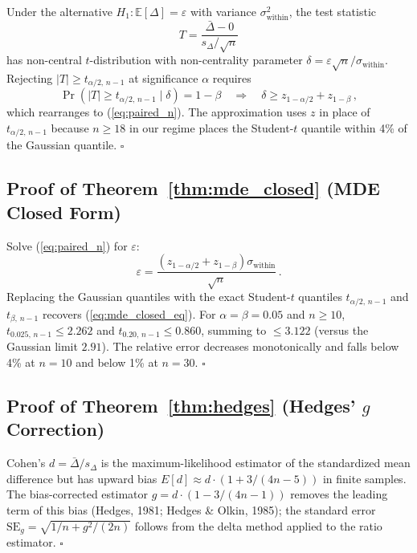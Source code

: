 \documentclass[11pt]{article}
\theoremstyle{definition}
\begin{document}
Under the alternative $H_1: \mathbb{E}[\Delta] = \varepsilon$ with variance $\sigma_\text{within}^2$, the test statistic
\begin{equation*}
    T = \frac{\bar{\Delta} - 0}{s_\Delta / \sqrt{n}}
\end{equation*}
has non-central $t$-distribution with non-centrality parameter $\delta = \varepsilon \sqrt{n} / \sigma_\text{within}$. Rejecting $|T| \ge t_{\alpha/2,\,n-1}$ at significance $\alpha$ requires
\begin{equation*}
    \Pr(|T| \ge t_{\alpha/2,\,n-1} \mid \delta) = 1 - \beta \quad \Longrightarrow \quad \delta \ge z_{1-\alpha/2} + z_{1-\beta}\,,
\end{equation*}
which rearranges to (\ref{eq:paired_n}). The approximation uses $z$ in place of $t_{\alpha/2,\,n-1}$ because $n \ge 18$ in our regime places the Student-$t$ quantile within 4\% of the Gaussian quantile. $\square$

\subsection*{Proof of Theorem~\ref{thm:mde_closed} (MDE Closed Form)}

Solve (\ref{eq:paired_n}) for $\varepsilon$:
\begin{equation*}
    \varepsilon = \frac{(z_{1-\alpha/2} + z_{1-\beta}) \sigma_\text{within}}{\sqrt{n}}\,.
\end{equation*}
Replacing the Gaussian quantiles with the exact Student-$t$ quantiles $t_{\alpha/2,\,n-1}$ and $t_{\beta,\,n-1}$ recovers (\ref{eq:mde_closed_eq}). For $\alpha = \beta = 0.05$ and $n \ge 10$, $t_{0.025,\,n-1} \le 2.262$ and $t_{0.20,\,n-1} \le 0.860$, summing to $\le 3.122$ (versus the Gaussian limit $2.91$). The relative error decreases monotonically and falls below 4\% at $n = 10$ and below 1\% at $n = 30$. $\square$

\subsection*{Proof of Theorem~\ref{thm:hedges} (Hedges' $g$ Correction)}

Cohen's $d = \bar{\Delta}/s_\Delta$ is the maximum-likelihood estimator of the standardized mean difference but has upward bias $E[d] \approx d \cdot (1 + 3/(4n - 5))$ in finite samples. The bias-corrected estimator $g = d \cdot (1 - 3/(4n - 1))$ removes the leading term of this bias (Hedges, 1981; Hedges \& Olkin, 1985); the standard error $\mathrm{SE}_g = \sqrt{1/n + g^2/(2n)}$ follows from the delta method applied to the ratio estimator. $\square$
\end{document}
